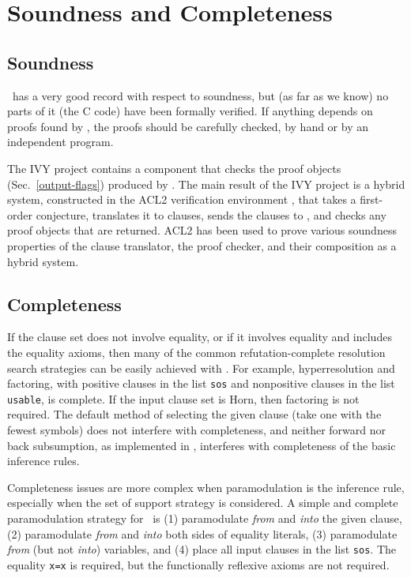 \documentclass[11pt]{article}
\begin{document}

\section{Soundness and Completeness}

\subsection{Soundness} \label{ivy}

\otter\ has a very good record with respect to soundness,
but (as far as we know) no parts of it (the C code) have been formally
verified.  If anything depends on proofs found by
\otter, the proofs should be carefully checked, by hand or
by an independent program.

The IVY project \cite{ivy} contains a component that
checks the proof objects (Sec.~\ref{output-flags})
produced by \otter.  The main result of the IVY project is
a hybrid system, constructed in the ACL2 verification
environment \cite{acl2-approach}, that takes a first-order
conjecture, translates it to clauses, sends the clauses
to \otter, and checks any proof objects that are returned.
ACL2 has been used to prove various soundness properties of
the clause translator, the proof checker, and their
composition as a hybrid system.

\subsection{Completeness}

If the clause set does not involve equality, or if it involves
equality and includes the equality axioms, then many of the common
refutation-complete resolution search strategies can be easily
achieved with \otter.  For example, hyperresolution and factoring,
with positive clauses in the list \verb:sos: and nonpositive clauses in
the list \verb:usable:, is complete.  If the input clause set is Horn,
then factoring is not required.
The default method of selecting the given clause (take one with the
fewest symbols) does not interfere with completeness, and neither
forward nor back subsumption, as implemented in
\otter, interferes with completeness of the basic inference
rules.

Completeness issues are more complex when paramodulation is the
inference rule, especially when the set of support strategy is
considered.  A simple and complete paramodulation strategy for \otter\
is (1) paramodulate {\em from} and {\em into} the given clause, (2)
paramodulate {\em from} and {\em into} both sides of equality
literals, (3) paramodulate {\em from} (but not {\em into}) variables,
and (4) place all input clauses in the list \verb:sos:.  The equality
\verb:x=x: is required, but the functionally reflexive axioms are not
required.
\end{document}
